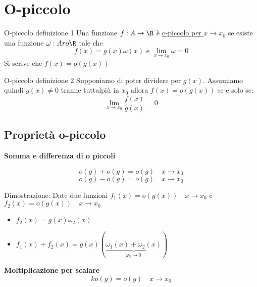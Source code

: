 \section{O-piccolo}
\begin{definizione}{O-piccolo definizione 1}
	Una funzione $ f: A \rightarrow \R$ è \underline{o-piccolo per $x \to x_0$} se esiste una funzione $\omega : A ro \R$ tale che
	\[
		f\left( x \right) =g\left( x \right) \omega \left( x \right) \text{ e } \lim_{x \to x_0} \omega =0
	\]
	Si scrive che $f\left( x \right) = o\left( g\left( x \right)  \right) $

\end{definizione}

\begin{definizione}{O-piccolo definizione 2
	}
	Supponiamo di poter dividere per $g\left( x \right) $. Assumiamo quindi $g\left( x \right) \neq 0$ tranne tuttalpiù in $x_0$ allora $f\left( x \right) = o\left( g\left( x \right)  \right) $ se e solo se:
	\[
		\lim_{x \to x_0} \frac{f\left( x \right) }{g\left( x \right) } =0
	\]
\end{definizione}

\subsection{Proprietà o-piccolo}
\textbf{Somma e differenza di o piccoli}

\[
	o\left( g \right) + o\left( g \right)  = o \left( g \right) \quad x \to x_0
\]
\[
	o\left( g \right) - o\left( g \right) = o\left( g \right) \quad x \to x_0
\]

Dimostrazione:
\vskip3mm
Date due funzioni $f_1\left( x \right)  = o\left( g\left( x \right)  \right) \quad x \to x_0$ e $f_2\left( x \right) = o\left( g\left( x \right)  \right) \quad x \to x_0$
\begin{itemize}
	\item $f_2\left( x \right) = g\left( x \right) \omega_2 \left( x \right) $
	\item $f_1\left( x \right) + f_2\left( x \right) = g\left( x \right) \left( \underbrace{\omega_1\left( x \right) + \omega_2\left( x \right) }_{\omega_3 \to 0} \right) $
\end{itemize}

\textbf{Moltiplicazione per scalare}
\[
	k o\left( g \right) = o\left( g \right)  \quad  x \to x_0
\]

